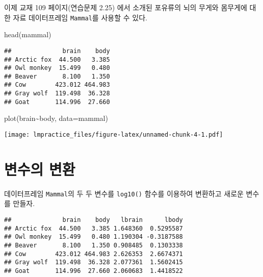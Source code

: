 \documentclass[
]{book}
\newenvironment{Shaded}{\begin{snugshade}}{\end{snugshade}}
\newcommand{\AttributeTok}[1]{\textcolor[rgb]{0.77,0.63,0.00}{#1}}
\newcommand{\FunctionTok}[1]{\textcolor[rgb]{0.00,0.00,0.00}{#1}}
\newcommand{\NormalTok}[1]{#1}
\newcommand{\OtherTok}[1]{\textcolor[rgb]{0.56,0.35,0.01}{#1}}
\newcommand{\SpecialCharTok}[1]{\textcolor[rgb]{0.00,0.00,0.00}{#1}}
\begin{document}
이제 교재 109 페이지(연습문제 2.25) 에서 소개된 포유류의 뇌의 무게와 몸무게에 대한 자료 데이터프레임 \texttt{Mammal}를 사용할 수 있다.

\begin{Shaded}
\begin{Highlighting}[]
\FunctionTok{head}\NormalTok{(mammal)}
\end{Highlighting}
\end{Shaded}

\begin{verbatim}
##              brain    body
## Arctic fox  44.500   3.385
## Owl monkey  15.499   0.480
## Beaver       8.100   1.350
## Cow        423.012 464.983
## Gray wolf  119.498  36.328
## Goat       114.996  27.660
\end{verbatim}

\begin{Shaded}
\begin{Highlighting}[]
\FunctionTok{plot}\NormalTok{(brain}\SpecialCharTok{\textasciitilde{}}\NormalTok{body, }\AttributeTok{data=}\NormalTok{mammal) }
\end{Highlighting}
\end{Shaded}

\texttt{[image: lmpractice\_files/figure-latex/unnamed-chunk-4-1.pdf]}

\hypertarget{uxbcc0uxc218uxc758-uxbcc0uxd658}{%
\section{변수의 변환}\label{uxbcc0uxc218uxc758-uxbcc0uxd658}}

데이터프레임 \texttt{Mammal}의 두 두 변수를 \texttt{log10()} 함수를 이용하여 변환하고 새로운 변수를 만들자.

\begin{Shaded}
\end{Shaded}

\begin{verbatim}
##              brain    body   lbrain      lbody
## Arctic fox  44.500   3.385 1.648360  0.5295587
## Owl monkey  15.499   0.480 1.190304 -0.3187588
## Beaver       8.100   1.350 0.908485  0.1303338
## Cow        423.012 464.983 2.626353  2.6674371
## Gray wolf  119.498  36.328 2.077361  1.5602415
## Goat       114.996  27.660 2.060683  1.4418522
\end{verbatim}
\end{document}
